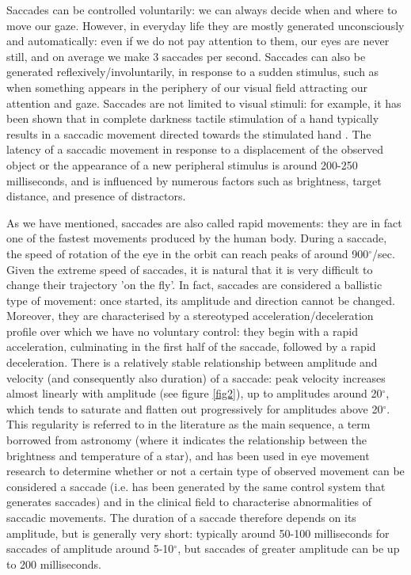 \documentclass[11pt]{article}
\begin{document}
Saccades can be controlled voluntarily: we can always decide when and where to move our gaze. However, in everyday life they are mostly generated unconsciously and automatically: even if we do not pay attention to them, our eyes are never still, and on average we make 3 saccades per second. Saccades can also be generated reflexively/involuntarily, in response to a sudden stimulus, such as when something appears in the periphery of our visual field attracting our attention and gaze. Saccades are not limited to visual stimuli: for example, it has been shown that in complete darkness tactile stimulation of a hand typically results in a saccadic movement directed towards the stimulated hand \cite{Groh1996}. The latency of a saccadic movement in response to a displacement of the observed object or the appearance of a new peripheral stimulus is around 200-250 milliseconds, and is influenced by numerous factors such as brightness, target distance, and presence of distractors.

As we have mentioned, saccades are also called rapid movements: they are in fact one of the fastest movements produced by the human body. During a saccade, the speed of rotation of the eye in the orbit can reach peaks of around 900$^{\circ}$/sec. Given the extreme speed of saccades, it is natural that it is very difficult to change their trajectory 'on the fly'. In fact, saccades are considered a ballistic type of movement: once started, its amplitude and direction cannot be changed. Moreover, they are characterised by a stereotyped acceleration/deceleration profile over which we have no voluntary control: they begin with a rapid acceleration, culminating in the first half of the saccade, followed by a rapid deceleration. There is a relatively stable relationship between amplitude and velocity (and consequently also duration) of a saccade: peak velocity increases almost linearly with amplitude (see figure \ref{fig2}), up to amplitudes around 20$^{\circ}$, which tends to saturate and flatten out progressively for amplitudes above 20$^{\circ}$. This regularity is referred to in the literature as the main sequence, a term borrowed from astronomy (where it indicates the relationship between the brightness and temperature of a star), and has been used in eye movement research to determine whether or not a certain type of observed movement can be considered a saccade (i.e. has been generated by the same control system that generates saccades) and in the clinical field to characterise abnormalities of saccadic movements. The duration of a saccade therefore depends on its amplitude, but is generally very short: typically around 50-100 milliseconds for saccades of amplitude around 5-10$^{\circ}$, but saccades of greater amplitude can be up to 200 milliseconds.
\end{document}
